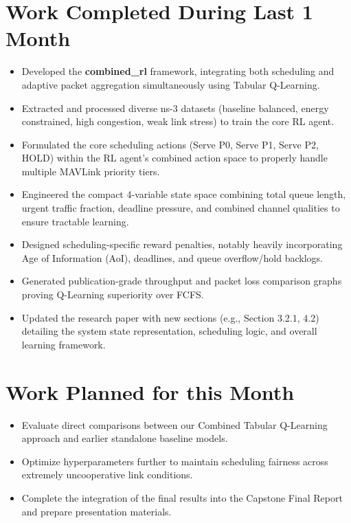 \documentclass[12pt,a4paper]{article}
\begin{document}
\section{Work Completed During Last 1 Month}
\begin{itemize}[leftmargin=*]
    \item Developed the \textbf{combined\_rl} framework, integrating both scheduling and adaptive packet aggregation simultaneously using Tabular Q-Learning.
    \item Extracted and processed diverse ns-3 datasets (baseline balanced, energy constrained, high congestion, weak link stress) to train the core RL agent.
    \item Formulated the core scheduling actions (Serve P0, Serve P1, Serve P2, HOLD) within the RL agent's combined action space to properly handle multiple MAVLink priority tiers.
    \item Engineered the compact 4-variable state space combining total queue length, urgent traffic fraction, deadline pressure, and combined channel qualities to ensure tractable learning.
    \item Designed scheduling-specific reward penalties, notably heavily incorporating Age of Information (AoI), deadlines, and queue overflow/hold backlogs.
    \item Generated publication-grade throughput and packet loss comparison graphs proving Q-Learning superiority over FCFS.
    \item Updated the research paper with new sections (e.g., Section 3.2.1, 4.2) detailing the system state representation, scheduling logic, and overall learning framework.
\end{itemize}

\section{Work Planned for this Month}
\begin{itemize}[leftmargin=*]
    \item Evaluate direct comparisons between our Combined Tabular Q-Learning approach and earlier standalone baseline models.
    \item Optimize hyperparameters further to maintain scheduling fairness across extremely uncooperative link conditions.
    \item Complete the integration of the final results into the Capstone Final Report and prepare presentation materials.
\end{itemize}
\end{document}
